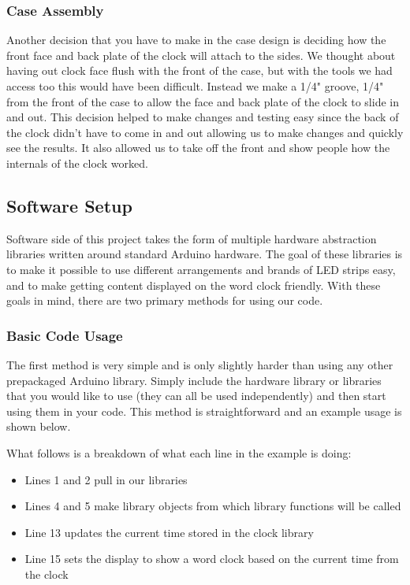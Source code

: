 \documentclass[onecolumn, draftclsnofoot,10pt, compsoc]{IEEEtran}
\begin{document}
\subsubsection{Case Assembly}
Another decision that you have to make in the case design is deciding how the front face and back plate of the clock will attach to the sides.
We thought about having out clock face flush with the front of the case, but with the tools we had access too this would have been difficult.
Instead we make a 1/4" groove, 1/4" from the front of the case to allow the face and back plate of the clock to slide in and out.
This decision helped to make changes and testing easy since the back of the clock didn't have to come in and out allowing us to make changes and quickly see the results.
It also allowed us to take off the front and show people how the internals of the clock worked.

\subsection{Software Setup}
Software side of this project takes the form of multiple hardware abstraction libraries written around standard Arduino hardware.
The goal of these libraries is to make it possible to use different arrangements and brands of LED strips easy, and to make getting content displayed on the word clock friendly.
With these goals in mind, there are two primary methods for using our code.
 
\subsubsection{Basic Code Usage}

The first method is very simple and is only slightly harder than using any other prepackaged Arduino library.
Simply include the hardware library or libraries that you would like to use (they can all be used independently) and then start using them in your code.
This method is straightforward and an example usage is shown below.



What follows is a breakdown of what each line in the example is doing:
\begin{itemize}
	\item Lines 1 and 2 pull in our libraries
	\item Lines 4 and 5 make library objects from which library functions will be called
	\item Line 13 updates the current time stored in the clock library
	\item Line 15 sets the display to show a word clock based on the current time from the clock
\end{itemize}
\end{document}
